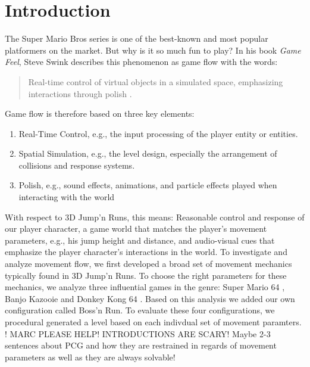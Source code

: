 \documentclass[conference]{IEEEtran}
\begin{document}
\section{Introduction}

The Super Mario Bros series is one of the best-known and most popular platformers on the market.
But why is it so much fun to play?
In his book \textit{Game Feel}, Steve Swink describes this phenomenon as game flow with the words:

\begin{quote}
    Real-time control of virtual objects in a simulated space, emphasizing interactions through polish \cite{swink2008game}.
\end{quote}

Game flow is therefore based on three key elements:

\begin{enumerate}
    \item Real-Time Control, e.g., the input processing of the player entity or entities.
    \item Spatial Simulation, e.g., the level design, especially the arrangement of collisions and response systems.
    \item Polish, e.g., sound effects, animations, and particle effects played when interacting with the world
\end{enumerate}

With respect to 3D Jump'n Runs, this means: Reasonable control and response of our player character, a game world that matches the player's movement parameters, e.g., his jump height and distance, and audio-visual cues that emphasize the player character's interactions in the world.
To investigate and analyze movement flow, we first developed a broad set of movement mechanics typically found in 3D Jump'n Runs.
To choose the right parameters for these mechanics, we analyze three influential games in the genre: Super Mario 64 \cite{SuperMario64}, Banjo Kazooie \cite{BanjoKazooie} and Donkey Kong 64 \cite{DonkeyKong64}.
Based on this analysis we added our own configuration called Boss'n Run.
To evaluate these four configurations, we procedural generated a level based on each indivdual set of movement paramters. 
! MARC PLEASE HELP! INTRODUCTIONS ARE SCARY! 
Maybe 2-3 sentences about PCG and how they are restrained in regards of movement parameters as well as they are always solvable!
\end{document}
